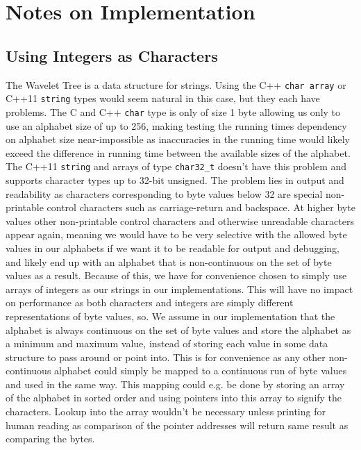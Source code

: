 \section{Notes on Implementation}

\subsection{Using Integers as Characters}
\label{sec:UsingIntAsChar}
The Wavelet Tree is a data structure for strings. Using the C++ \texttt{char array} or C++11 \texttt{string} types would seem natural in this case, but they each have problems.
The C and C++ \texttt{char} type is only of size 1 byte allowing us only to use an alphabet size of up to 256, making testing the running times dependency on alphabet size near-impossible as inaccuracies in the running time would likely exceed the difference in running time between the available sizes of the alphabet.
The C++11 \texttt{string} and arrays of type \texttt{char32\_t} doesn't have this problem and supports character types up to 32-bit unsigned. The problem lies in output and readability as characters corresponding to byte values below 32 are special non-printable control characters such as carriage-return and backspace. At higher byte values other non-printable control characters and otherwise unreadable characters appear again, meaning we would have to be very selective with the allowed byte values in our alphabets if we want it to be readable for output and debugging, and likely end up with an alphabet that is non-continuous on the set of byte values as a result.
Because of this, we have for convenience chosen to simply use arrays of integers as our strings in our implementations.
This will have no impact on performance as both characters and integers are simply different representations of byte values, so.
We assume in our implementation that the alphabet is always continuous on the set of byte values and store the alphabet as a minimum and maximum value, instead of storing each value in some data structure to pass around or point into.
This is for convenience as any other non-continuous alphabet could simply be mapped to a continuous run of byte values and used in the same way. 
This mapping could e.g. be done by storing an array of the alphabet in sorted order and using pointers into this array to signify the characters. 
Lookup into the array wouldn't be necessary unless printing for human reading as comparison of the pointer addresses will return same result as comparing the bytes.

